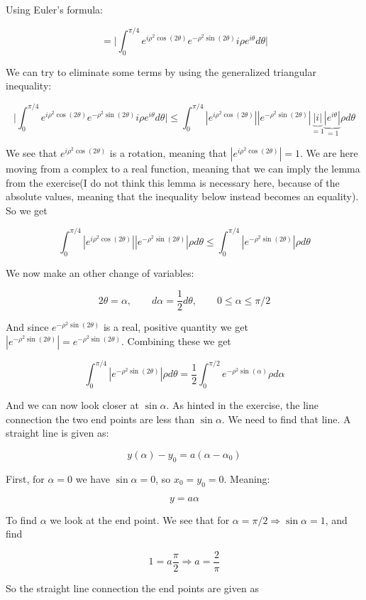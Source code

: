 \documentclass[a4paper,norsk, 10pt]{article}
\begin{document}
Using Euler's formula:

$$
= \big|\int_0^{\pi/4} e^{i\rho^2 \cos(2\theta)}e^{-\rho^2 \sin(2\theta)} i\rho e^{i\theta} d\theta \big|
$$

We can try to eliminate some terms by using the generalized triangular inequality:

$$
\big|\int_0^{\pi/4} e^{i\rho^2 \cos(2\theta)}e^{-\rho^2 \sin(2\theta)} i\rho e^{i\theta} d\theta \big| \leq \int_0^{\pi/4} |e^{i\rho^2 \cos(2\theta)}||e^{-\rho^2 \sin(2\theta)}|\underbrace{|i|}_{=1}\underbrace{|e^{i\theta}|}_{=1}\rho d\theta
$$

We see that $e^{i\rho^2 \cos(2\theta)}$ is a rotation, meaning that $|e^{i\rho^2 \cos(2\theta)}| = 1$. We are here moving from a complex to a real function, meaning that we can imply the lemma from the exercise(I do not think this lemma is necessary here, because of the absolute values, meaning that the inequality below instead becomes an equality). So we get

$$
\int_0^{\pi/4} |e^{i\rho^2 \cos(2\theta)}||e^{-\rho^2 \sin(2\theta)}|\rho d\theta \leq \int_0^{\pi/4} |e^{-\rho^2 \sin(2\theta)}|\rho d\theta
$$

We now make an other change of variables:

$$
2\theta = \alpha, \qquad d\alpha = \frac{1}{2} d\theta, \qquad 0 \leq \alpha \leq \pi/2
$$

And since $e^{-\rho^2 \sin(2\theta)}$ is a real, positive quantity we get $|e^{-\rho^2 \sin(2\theta)}| = e^{-\rho^2 \sin(2\theta)}$. Combining these we get 

$$
\int_0^{\pi/4} |e^{-\rho^2 \sin(2\theta)}|\rho d\theta = \frac{1}{2}\int_0^{\pi/2} e^{-\rho^2 \sin(\alpha)}\rho d\alpha
$$

And we can now look closer at $\sin \alpha$. As hinted in the exercise, the line connection the two end points are less than $\sin \alpha$. We need to find that line. A straight line is given as:

$$
y(\alpha) - y_0 = a(\alpha - \alpha_0)
$$

First, for $\alpha = 0$ we have $\sin \alpha = 0$, so $x_0 = y_0 = 0$. Meaning:

$$
y = a\alpha
$$

To find $\alpha$ we look at the end point. We see that for $\alpha = \pi/2 \Rightarrow \sin\alpha = 1$, and find 

$$
1 = a\frac{\pi}{2} \Rightarrow a = \frac{2}{\pi}
$$ 

So the straight line connection the end points are given as
\end{document}
